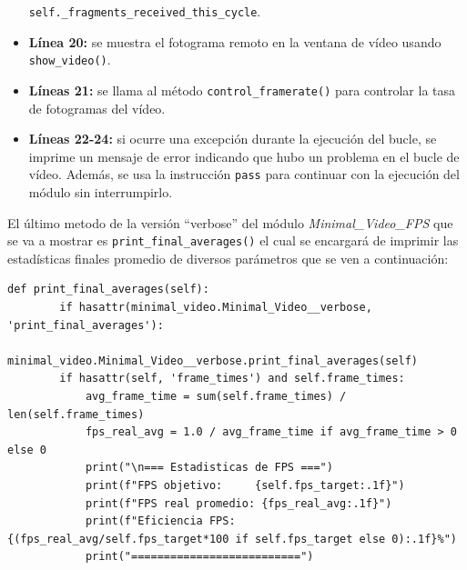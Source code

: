 \begin{itemize}
    \texttt{self.\_fragments\_received\_this\_cycle}.
    \item \textbf{Línea 20:} se muestra el fotograma remoto en la ventana de vídeo usando \texttt{show\_video()}.
    \item \textbf{Líneas 21:} se llama al método \texttt{control\_framerate()} para controlar la tasa de fotogramas del vídeo.
    \item \textbf{Líneas 22-24:} si ocurre una excepción durante la ejecución del bucle, se imprime un mensaje de error indicando que hubo un problema en el bucle de vídeo. Además, se usa la instrucción \texttt{pass} para continuar con la ejecución del módulo sin interrumpirlo.    
\end{itemize}
\vspace{\baselineskip}

El último metodo de la versión ``verbose'' del módulo \textit{Minimal\_Video\_FPS} que se va a mostrar es \texttt{print\_final\_averages()} el cual se encargará de imprimir las estadísticas finales promedio de diversos parámetros que se ven a continuación:
\begin{lstlisting}[style=pythonstyle, caption={Método \texttt{print\_final\_averages()} de \textit{Minimal\_Video\_FPS\_verbose}.}, label={lst:print_final_averages_minimal_video_fps_verbose}]
def print_final_averages(self):
        if hasattr(minimal_video.Minimal_Video__verbose, 'print_final_averages'):
            minimal_video.Minimal_Video__verbose.print_final_averages(self)
        if hasattr(self, 'frame_times') and self.frame_times:
            avg_frame_time = sum(self.frame_times) / len(self.frame_times)
            fps_real_avg = 1.0 / avg_frame_time if avg_frame_time > 0 else 0
            print("\n=== Estadisticas de FPS ===")
            print(f"FPS objetivo:     {self.fps_target:.1f}")
            print(f"FPS real promedio: {fps_real_avg:.1f}")
            print(f"Eficiencia FPS:    {(fps_real_avg/self.fps_target*100 if self.fps_target else 0):.1f}%")
            print("==========================")
\end{lstlisting}
\vspace{\baselineskip}

